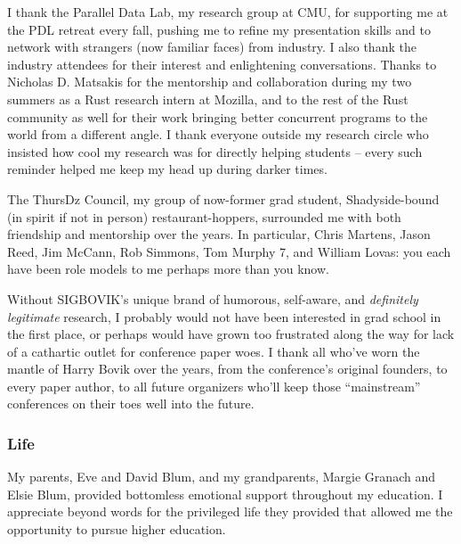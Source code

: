 \documentclass[12pt]{cmuthesis}
\begin{document}
\begin{acknowledgments}
{I thank the Parallel Data Lab, my research group at CMU,
for supporting me at the PDL retreat every fall,
pushing me to refine my presentation skills and to network with strangers (now familiar faces) from industry.
I also thank the industry attendees
for their interest %
and enlightening conversations.
Thanks to Nicholas D. Matsakis for the mentorship and collaboration during my two summers as a Rust research intern at Mozilla,
and to the rest of the Rust community as well for their %
work
bringing better concurrent programs to the world from a different angle.
I thank everyone outside my %
research circle who
insisted how cool my research was for directly helping students --
every such reminder helped me keep my head up during darker times.

The ThursDz Council,
my group of now-former grad student, Shadyside-bound (in spirit if not in person) restaurant-hoppers,
surrounded me with both friendship and mentorship over the years.
In particular,
Chris Martens,
Jason Reed,
Jim McCann,
Rob Simmons,
Tom Murphy 7,
and
William Lovas:
you each have been role models to me
perhaps more than you know.

Without SIGBOVIK's unique brand of humorous, self-aware, and {\em definitely legitimate} research,
I probably would not have been interested in grad school in the first place,
or perhaps would have grown too frustrated along the way for lack of a cathartic outlet for conference paper woes.
I thank all who've worn the mantle of Harry Bovik over the years,
from the conference's original founders,
to every paper author,
to all future organizers who'll keep those ``mainstream'' conferences on their toes well into the future.

\subsubsection{Life}

My parents, Eve and David Blum, and my grandparents, Margie Granach and Elsie Blum,
provided bottomless emotional support throughout my education.
I appreciate beyond words for the privileged life they provided
that allowed me the opportunity to pursue higher education.

}
\end{acknowledgments}
\end{document}
